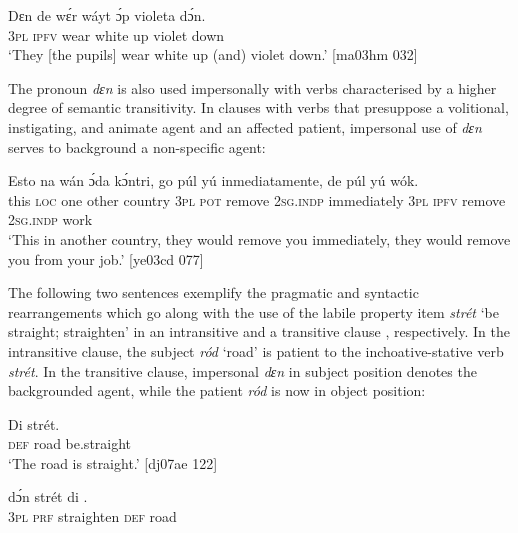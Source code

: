 \ea%
    \label{ex:key:1341}
    \gll Dɛn  de  wɛ́r    wáyt  ɔ́p  violeta  dɔ́n.\\
\textsc{3pl}  \textsc{ipfv}  wear  white  up  violet  down\\

\glt ‘They [the pupils] wear white up (and) violet down.’ [ma03hm 032]
\z

The pronoun \textit{dɛn} is also used impersonally with verbs characterised by a higher degree of semantic transitivity. In clauses with verbs that presuppose a volitional, instigating, and animate agent and an affected patient, impersonal use of \textit{dɛn} serves to background a non-specific agent:


\ea%
    \label{ex:key:1342}
    \gll Esto    na  wán    ɔ́da    kɔ́ntri,    go  púl    yú    inmediatamente,
  de  púl    yú    wók.\\
this    \textsc{loc}  one    other  country  \textsc{3pl}  \textsc{pot}  remove  \textsc{2sg.indp}  immediately
\textsc{3pl}  \textsc{ipfv}  remove  \textsc{2sg.indp}  work\\

\glt ‘This in another country, they would remove you immediately, they
would remove you from your job.’ [ye03cd 077]
\z

The following two sentences exemplify the pragmatic and syntactic rearrangements which go along with the use of the labile property item \textit{strét} ‘be straight; straighten’ in an intransitive  and a transitive clause , respectively. In the intransitive clause, the subject \textit{ród} ‘road’ is patient to the inchoative-stative verb \textit{strét}. In the transitive clause, impersonal \textit{dɛn} in subject position denotes the backgrounded agent, while the patient \textit{ród} is now in object position: 


\ea%
    \label{ex:key:1343}
    \gll Di      strét.\\
\textsc{def}  road    be.straight\\

\glt ‘The road is straight.’ [dj07ae 122]
\z


\ea%
    \label{ex:key:1344}
    \gll {}    dɔ́n    strét    di  .\\
\textsc{3pl}    \textsc{prf}    straighten  \textsc{def}  road\\


